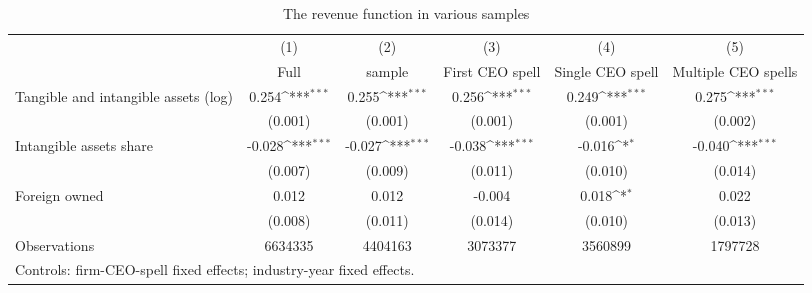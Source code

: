 \begin{table}[htbp]\centering
\def\sym#1{\ifmmode^{#1}\else\(^{#1}\)\fi}
\caption{The revenue function in various samples}
\begin{tabular}{l*{5}{c}}
\hline\hline
                    &\multicolumn{1}{c}{(1)}&\multicolumn{1}{c}{(2)}&\multicolumn{1}{c}{(3)}&\multicolumn{1}{c}{(4)}&\multicolumn{1}{c}{(5)}\\
                    &\multicolumn{1}{c}{Full}&\multicolumn{1}{c}{sample}&\multicolumn{1}{c}{First CEO spell}&\multicolumn{1}{c}{Single CEO spell}&\multicolumn{1}{c}{Multiple CEO spells}\\
\hline
Tangible and intangible assets (log)&       0.254\sym{***}&       0.255\sym{***}&       0.256\sym{***}&       0.249\sym{***}&       0.275\sym{***}\\
                    &     (0.001)         &     (0.001)         &     (0.001)         &     (0.001)         &     (0.002)         \\
[1em]
Intangible assets share&      -0.028\sym{***}&      -0.027\sym{***}&      -0.038\sym{***}&      -0.016\sym{*}  &      -0.040\sym{***}\\
                    &     (0.007)         &     (0.009)         &     (0.011)         &     (0.010)         &     (0.014)         \\
[1em]
Foreign owned       &       0.012         &       0.012         &      -0.004         &       0.018\sym{*}  &       0.022         \\
                    &     (0.008)         &     (0.011)         &     (0.014)         &     (0.010)         &     (0.013)         \\
\hline
Observations        &     6634335         &     4404163         &     3073377         &     3560899         &     1797728         \\
\hline\hline
\multicolumn{6}{l}{\footnotesize Controls: firm-CEO-spell fixed effects; industry-year fixed effects.}\\
\end{tabular}
\end{table}

